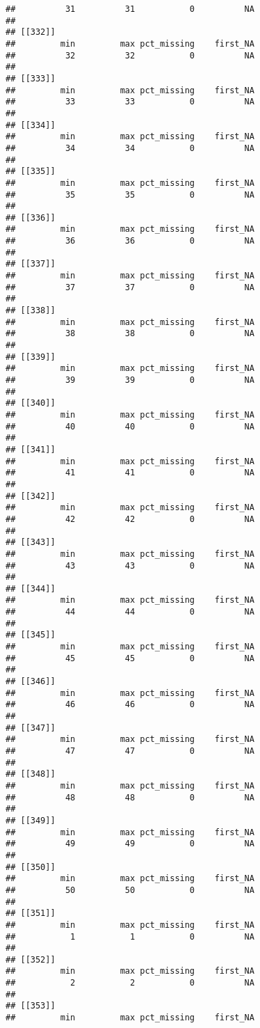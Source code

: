 \documentclass[
]{article}
\begin{document}
\begin{verbatim}
##          31          31           0          NA 
## 
## [[332]]
##         min         max pct_missing    first_NA 
##          32          32           0          NA 
## 
## [[333]]
##         min         max pct_missing    first_NA 
##          33          33           0          NA 
## 
## [[334]]
##         min         max pct_missing    first_NA 
##          34          34           0          NA 
## 
## [[335]]
##         min         max pct_missing    first_NA 
##          35          35           0          NA 
## 
## [[336]]
##         min         max pct_missing    first_NA 
##          36          36           0          NA 
## 
## [[337]]
##         min         max pct_missing    first_NA 
##          37          37           0          NA 
## 
## [[338]]
##         min         max pct_missing    first_NA 
##          38          38           0          NA 
## 
## [[339]]
##         min         max pct_missing    first_NA 
##          39          39           0          NA 
## 
## [[340]]
##         min         max pct_missing    first_NA 
##          40          40           0          NA 
## 
## [[341]]
##         min         max pct_missing    first_NA 
##          41          41           0          NA 
## 
## [[342]]
##         min         max pct_missing    first_NA 
##          42          42           0          NA 
## 
## [[343]]
##         min         max pct_missing    first_NA 
##          43          43           0          NA 
## 
## [[344]]
##         min         max pct_missing    first_NA 
##          44          44           0          NA 
## 
## [[345]]
##         min         max pct_missing    first_NA 
##          45          45           0          NA 
## 
## [[346]]
##         min         max pct_missing    first_NA 
##          46          46           0          NA 
## 
## [[347]]
##         min         max pct_missing    first_NA 
##          47          47           0          NA 
## 
## [[348]]
##         min         max pct_missing    first_NA 
##          48          48           0          NA 
## 
## [[349]]
##         min         max pct_missing    first_NA 
##          49          49           0          NA 
## 
## [[350]]
##         min         max pct_missing    first_NA 
##          50          50           0          NA 
## 
## [[351]]
##         min         max pct_missing    first_NA 
##           1           1           0          NA 
## 
## [[352]]
##         min         max pct_missing    first_NA 
##           2           2           0          NA 
## 
## [[353]]
##         min         max pct_missing    first_NA 

\end{verbatim}
\end{document}

